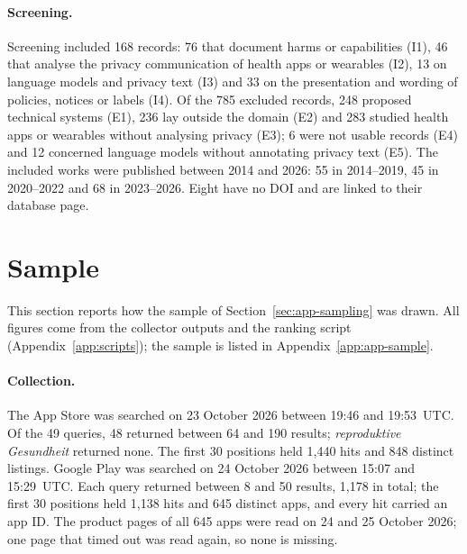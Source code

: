 \paragraph{Screening.} Screening included 168 records: 76 that document harms
or capabilities (I1), 46 that analyse the privacy communication of health apps
or wearables (I2), 13 on language models and privacy text (I3) and 33 on the
presentation and wording of policies, notices or labels (I4). Of the 785
excluded records, 248 proposed technical systems (E1), 236 lay outside the
domain (E2) and 283 studied health apps or wearables without analysing privacy
(E3); 6 were not usable records (E4) and 12 concerned language models without
annotating privacy text (E5). The included works were published between 2014
and 2026: 55 in 2014--2019, 45 in 2020--2022 and 68 in 2023--2026. Eight have no
DOI and are linked to their database page.

\section{Sample}
\label{sec:results-sample}
This section reports how the sample of Section~\ref{sec:app-sampling} was
drawn. All figures come from the collector outputs and the ranking script
(Appendix~\ref{app:scripts}); the sample is listed in
Appendix~\ref{app:app-sample}.

\paragraph{Collection.} The App Store was searched on 23 October 2026 between
19:46 and 19:53~UTC\@. Of the 49 queries, 48 returned between 64 and 190 results;
\emph{reproduktive Gesundheit} returned none. The first 30 positions held 1{,}440
hits and 848 distinct listings. Google Play was searched on 24 October 2026
between 15:07 and 15:29~UTC\@. Each query returned between 8 and 50 results, 1{,}178
in total; the first 30 positions held 1{,}138 hits and 645 distinct apps, and
every hit carried an app ID\@. The product pages of all 645 apps were read on
24 and 25 October 2026; one page that timed out was read again, so none is
missing.

